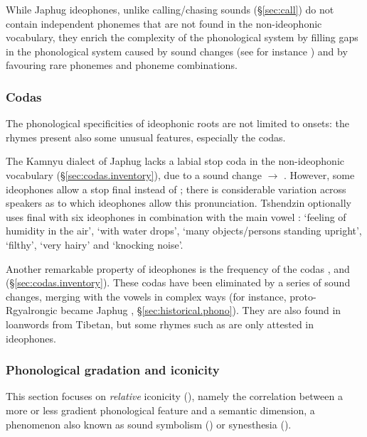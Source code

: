 While Japhug ideophones, unlike calling/chasing sounds (§\ref{sec:call}) do not contain independent phonemes that are not found  in the non-ideophonic vocabulary, they enrich the complexity of the phonological system by filling gaps in the phonological system caused by sound changes (see for instance \citealt{diffloth79expressive}) and by favouring rare phonemes and phoneme combinations.

\subsubsection{Codas} \label{sec:coda.idph}
The phonological specificities of ideophonic roots are not limited to onsets: the rhymes present also some unusual features, especially the codas.

The Kamnyu dialect of Japhug lacks a labial stop coda in the non-ideophonic vocabulary (§\ref{sec:codas.inventory}), due to a sound change  $\rightarrow$ . However, some ideophones allow a stop final   instead of ; there is considerable variation across speakers as to which ideophones allow this pronunciation. Tshendzin optionally uses final  with six ideophones in combination with the main vowel :  `feeling of humidity in the air',  `with water drops',  `many objects/persons standing upright',  `filthy',  `very hairy' and  `knocking noise'.

Another remarkable property of ideophones is the frequency of the codas ,  and  (§\ref{sec:codas.inventory}). These codas have been eliminated by a series of sound changes, merging with the vowels in complex ways (for instance, proto-Rgyalrongic  became Japhug , §\ref{sec:historical.phono}). They are also found in loanwords from Tibetan, but some rhymes such as  are only attested in ideophones.
 
 
\subsubsection{Phonological gradation and iconicity} \label{sec:idph.gradation}
This section focuses on \textit{relative} iconicity (\citealt[47]{dingemanse11ezra}), namely the correlation between a more or less gradient phonological feature and a semantic dimension, a phenomenon also known as sound symbolism  (\citealt[16]{deloria41})  or synesthesia (\citealt[186--187]{gerner04expressives1}).
 
